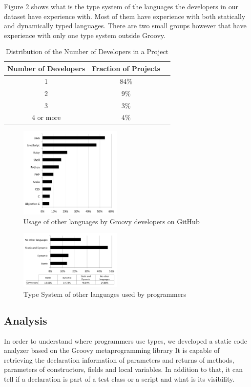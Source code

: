 \documentclass[preprint]{sigplanconf}
\begin{document}
Figure \ref{fig:typeSystem_background} shows what is the type system of the languages the developers in our dataset have experience with.
Most of them have experience with both statically and dynamically typed languages.
There are two small groups however that have experience with only one type system outside Groovy.
 
\begin{table}[ht]
\caption{Distribution of the Number of Developers in a Project}
\centering{}%
\begin{tabular}{|c|c|c|}
\hline 
Number of Developers & Fraction of Projects\tabularnewline
\hline 
\hline 
1 & 84\%\tabularnewline
\hline 
2 & 9\%\tabularnewline
\hline 
3 & 3\%\tabularnewline
\hline 
4 or more & 4\%\tabularnewline
\hline 
\end{tabular}
\label{tab:number_of_developers}
\end{table}

\begin{figure}[ht]
\centering \includegraphics[width=0.45\textwidth]{other_languages}
\caption{Usage of other languages by Groovy developers on GitHub}
\label{fig:other_languages} 
\end{figure}

\begin{figure}[ht]
\centering \includegraphics[width=0.45\textwidth]{typeSystem_background}
\caption{Type System of other languages used by programmers}
\label{fig:typeSystem_background} 
\end{figure}



\subsection{Analysis\label{analyzer}}
In order to understand where programmers use types, we developed a static code analyzer based on the Groovy metaprogramming library
It is capable of retrieving the declaration information of parameters and returns of methods, parameters of constructors, fields and local variables.
In addition to that, it can tell if a declaration is part of a test class or a script and what is its visibility.
\end{document}
